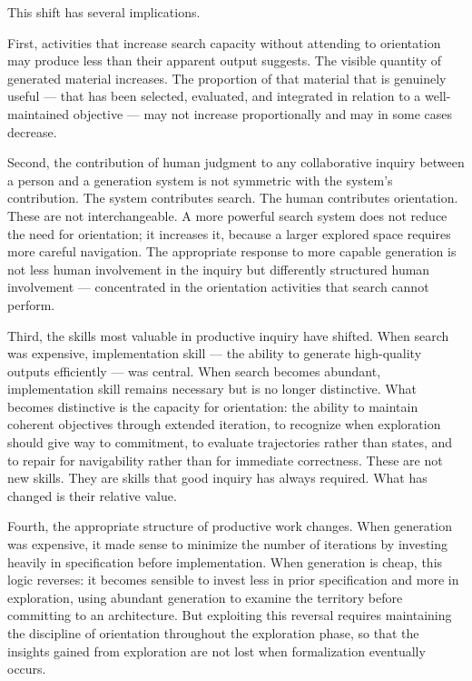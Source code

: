 This shift has several implications.

First, activities that increase search capacity without attending to orientation
may produce less than their apparent output suggests. The visible quantity of
generated material increases. The proportion of that material that is genuinely
useful --- that has been selected, evaluated, and integrated in relation to a
well-maintained objective --- may not increase proportionally and may in some
cases decrease.

Second, the contribution of human judgment to any collaborative inquiry between
a person and a generation system is not symmetric with the system's contribution.
The system contributes search. The human contributes orientation. These are not
interchangeable. A more powerful search system does not reduce the need for
orientation; it increases it, because a larger explored space requires more
careful navigation. The appropriate response to more capable generation is not
less human involvement in the inquiry but differently structured human involvement
--- concentrated in the orientation activities that search cannot perform.

Third, the skills most valuable in productive inquiry have shifted. When search
was expensive, implementation skill --- the ability to generate high-quality
outputs efficiently --- was central. When search becomes abundant, implementation
skill remains necessary but is no longer distinctive. What becomes distinctive
is the capacity for orientation: the ability to maintain coherent objectives
through extended iteration, to recognize when exploration should give way to
commitment, to evaluate trajectories rather than states, and to repair for
navigability rather than for immediate correctness. These are not new skills.
They are skills that good inquiry has always required. What has changed is their
relative value.

Fourth, the appropriate structure of productive work changes. When generation
was expensive, it made sense to minimize the number of iterations by investing
heavily in specification before implementation. When generation is cheap, this
logic reverses: it becomes sensible to invest less in prior specification and
more in exploration, using abundant generation to examine the territory before
committing to an architecture. But exploiting this reversal requires maintaining
the discipline of orientation throughout the exploration phase, so that the
insights gained from exploration are not lost when formalization eventually occurs.


